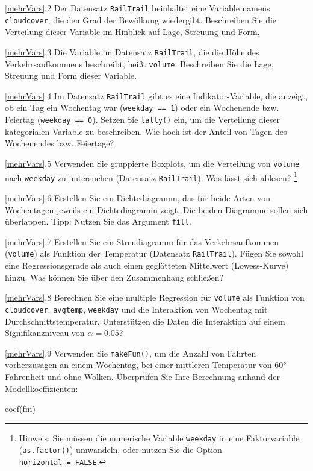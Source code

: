 \documentclass[
  ngerman,
]{scrbook}
\newenvironment{Shaded}{\begin{snugshade}}{\end{snugshade}}
\newcommand{\FunctionTok}[1]{\textcolor[rgb]{0.00,0.00,0.00}{#1}}
\newcommand{\NormalTok}[1]{#1}
\begin{document}
\ref{mehrVars}.2 Der Datensatz \texttt{RailTrail} beinhaltet eine Variable namens \texttt{cloudcover}, die den Grad der Bewölkung wiedergibt. Beschreiben Sie die Verteilung dieser Variable im Hinblick auf Lage, Streuung und Form.

\ref{mehrVars}.3 Die Variable im Datensatz \texttt{RailTrail}, die die Höhe des Verkehrsaufkommens beschreibt, heißt \texttt{volume}. Beschreiben Sie die Lage, Streuung und Form dieser Variable.

\ref{mehrVars}.4 Im Datensatz \texttt{RailTrail} gibt es eine Indikator-Variable, die anzeigt, ob ein Tag ein Wochentag war (\texttt{weekday\ ==\ 1}) oder ein Wochenende bzw. Feiertag (\texttt{weekday\ ==\ 0}). Setzen Sie \texttt{tally()} ein, um die Verteilung dieser kategorialen Variable zu beschreiben. Wie hoch ist der Anteil von Tagen des Wochenendes bzw. Feiertage?

\ref{mehrVars}.5 Verwenden Sie gruppierte Boxplots, um die Verteilung von \texttt{volume} nach \texttt{weekday} zu untersuchen (Datensatz \texttt{RailTrail}). Was lässt sich ablesen? \footnote{Hinweis: Sie müssen die numerische Variable \texttt{weekday} in eine Faktorvariable (\texttt{as.factor()}) umwandeln, oder nutzen Sie die Option \texttt{horizontal\ =\ FALSE}.}

\ref{mehrVars}.6 Erstellen Sie ein Dichtediagramm, das für beide Arten von Wochentagen jeweils ein Dichtediagramm zeigt. Die beiden Diagramme sollen sich überlappen. Tipp: Nutzen Sie das Argument \texttt{fill}.

\ref{mehrVars}.7 Erstellen Sie ein Streudiagramm für das Verkehrsaufkommen (\texttt{volume}) als Funktion der Temperatur (Datensatz \texttt{RailTrail}). Fügen Sie sowohl eine Regressionsgerade als auch einen geglätteten Mittelwert (Lowess-Kurve) hinzu. Was können Sie über den Zusammenhang schließen?

\ref{mehrVars}.8 Berechnen Sie eine multiple Regression für \texttt{volume} als Funktion von \texttt{cloudcover}, \texttt{avgtemp}, \texttt{weekday} und die Interaktion von Wochentag mit Durchschnittstemperatur. Unterstützen die Daten die Interaktion auf einem Signifikanzniveau von \(\alpha = 0.05\)?

\ref{mehrVars}.9 Verwenden Sie \texttt{makeFun()}, um die Anzahl von Fahrten vorherzusagen an einem Wochentag, bei einer mittleren Temperatur von 60° Fahrenheit und ohne Wolken. Überprüfen Sie Ihre Berechnung anhand der Modellkoeffizienten:

\begin{Shaded}
\begin{Highlighting}[]
\FunctionTok{coef}\NormalTok{(fm)}
\end{Highlighting}
\end{Shaded}
\end{document}
